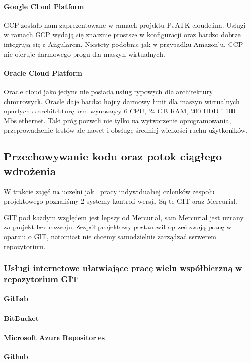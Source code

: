 \paragraph{Google Cloud Platform}
GCP zostało nam zaprezentowane w ramach projektu PJATK cloudelina.
Usługi w ramach GCP wydają się znacznie prostsze w konfiguracji oraz bardzo dobrze integrują się z Angularem.
Niestety podobnie jak w przypadku Amazon'u, GCP nie oferuje darmowego progu dla maszyn wirtualnych.

\paragraph{Oracle Cloud Platform}
Oracle cloud jako jedyne nie posiada usług typowych dla architektury chmurowych.
Oracle daje bardzo hojny darmowy limit dla maszyn wirtualnych opartych o architekturę arm wynoszący 6 CPU, 24 GB RAM, 200 HDD i 100 Mbs ethernet.
Taki próg pozwoli nie tylko na wytworzenie oprogramowania, przeprowadzenie testów ale nawet i obsługę średniej wielkości ruchu użytkoników.

\subsection{Przechowywanie kodu oraz potok ciągłego wdrożenia}
\label{subsec:przechowywanie-kodu-oraz-potok-ciagego-wdrozenia}

W trakcie zajęć na uczelni jak i pracy indywidualnej członków zespołu projektowego poznaliśmy 2 systemy kontroli wersji.
Są to GIT oraz Mercurial.

GIT pod każdym względem jest lepszy od Mercurial, sam Mercurial jest uznany za projekt bez rozwoju.
Zespół projektowy postanowił oprzeć swoją pracę w oparciu o GIT, natomiast nie chcemy samodzielnie zarządzać serwerem repozytorium.

\subsubsection{Usługi internetowe ułatwiające pracę wielu współbierzną w repozytorium GIT}
\paragraph{GitLab}
\paragraph{BitBucket}
\paragraph{Microsoft Azure Repositories}
\paragraph{Github}


